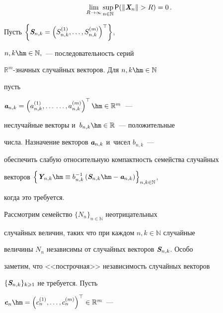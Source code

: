 \vspace*{2pt}





\noindent


$$


\lim_{R\to\infty}\sup_{n\in\mathbb{N}}{\sf P}(\|\vX_n\|>R)=0\,.


$$





\vspace*{-2pt}








Пусть $\left\{\emph{\textbf{S}}_{n,k}=\left(S_{n,k}^{(1)},\ldots,S_{n,k}^{(m)}\right)^{\top}\right\}$,


$n,k\hm\in\mathbb{N},$~--- последовательность серий


$\mathbb{R}^m$-знач\-ных случайных векторов. Для $n,k\hm\in\mathbb{N}$


пусть


$\emph{\textbf{a}}_{n,k}=\left(a_{n,k}^{(1)},\ldots\right.$\linebreak $\left.\ldots,a_{n,k}^{(m)}\right)^{\top}\hm\in\mathbb{R}^m$~---


неслучайные векторы и~$b_{n,k}\hm\in\mathbb{R}$~--- положительные


числа. Назначение векторов $\emph{\textbf{a}}_{n,k}$ и~чисел $b_{n,k}$~---


обеспечить слабую относительную компактность семейства случайных


векторов $\left\{\vY_{n,k}\hm\equiv


b_{n,k}^{-1}\left(\vS_{n,k}\hm-\va_{n,k}\right)\right\}_{n,k\in\mathbb{N}}$,


когда это требуется.





Рассмотрим семейство $\{N_n\}_{n\in\mathbb{N}}$ неотрицательных


случайных величин, таких что при каждом $n,k\in\mathbb{N}$ случайные


величины $N_n$ независимы от случайных векторов $\emph{\textbf{S}}_{n,k}$. Особо


заметим, что <<построчная>> независимость случайных векторов


$\{\emph{\textbf{S}}_{n,k}\}_{k\geqslant1}$ не требуется. Пусть


$\vc_n\hm=\left(c_n^{(1)},\ldots,c_n^{(m)}\right)^{\top}\in\mathbb{R}^m$~---


